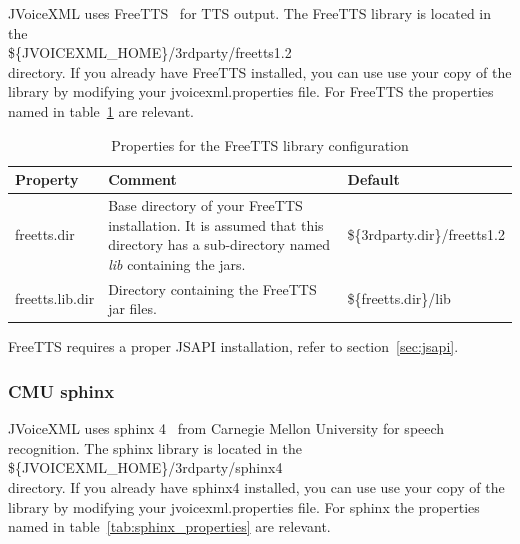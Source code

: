 \documentclass[11pt,a4paper]{article}
\begin{document}
JVoiceXML uses FreeTTS~\cite{freetts} for TTS output.
The FreeTTS library is located in the \\
\$\{JVOICEXML\_HOME\}/3rdparty/freetts1.2 \\
directory. If you already have FreeTTS installed, you can use
use your copy of the library by modifying your jvoicexml.properties file.
For FreeTTS the properties named in table~\ref{tab:freetts_properties} are 
relevant.

\begin{table}[h]
\caption{Properties for the FreeTTS library configuration}
\label{tab:freetts_properties}

\begin{center}

\begin{tabular}{|l|p{4cm}|l|}
\hline
\textbf{Property} & \textbf{Comment} & \textbf{Default} \\
\hline
\hline
freetts.dir & 
Base directory of your FreeTTS installation.
It is assumed that this directory
has a sub-directory named \emph{lib} containing the jars.
& \$\{3rdparty.dir\}/freetts1.2 \\
\hline
freetts.lib.dir & 
Directory containing the FreeTTS jar files.
& \$\{freetts.dir\}/lib \\
\hline
\end{tabular}

\end{center}

\end{table}

FreeTTS requires a proper JSAPI installation, refer to section~\ref{sec:jsapi}.

\subsubsection{CMU sphinx}
\label{sec:cmu-sphinx}

JVoiceXML uses sphinx 4~\cite{sphinx} from Carnegie Mellon University
for speech recognition.
The sphinx library is located in the \\
\$\{JVOICEXML\_HOME\}/3rdparty/sphinx4 \\
directory. If you already have sphinx4 installed, you can use
use your copy of the library by modifying your jvoicexml.properties file.
For sphinx the properties named in table~\ref{tab:sphinx_properties} are 
relevant.
\end{document}

